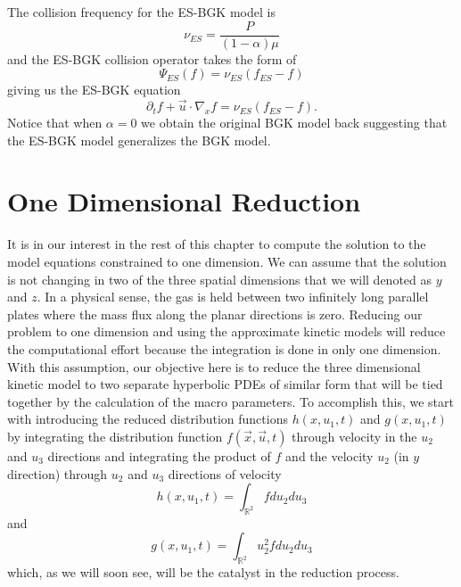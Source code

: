 The collision frequency for the ES-BGK model is
%
\begin{equation}
\nu_{ES} = \frac{P}{(1 - \alpha) \mu}
\end{equation}
%
and the ES-BGK collision operator takes the form of
%
\begin{equation}
\label{ESBGK}
\Psi_{ES}(f) = \nu_{ES} \left(f_{ES} - f \right)
\end{equation}
%
giving us the ES-BGK equation
%
\begin{equation}
\label{ESBGKeq}
\partial_t f + \vec{u} \cdot \nabla_x f = \nu_{ES} \left(f_{ES} - f \right).
\end{equation}
%
Notice that when $\alpha = 0$ we obtain the original BGK model back suggesting that the ES-BGK model generalizes the BGK model.
\section{One Dimensional Reduction}
It is in our interest in the rest of this chapter to compute the solution to the model equations constrained to one dimension. We can assume that the solution is not changing in two of the three spatial dimensions that we will denoted as $y$ and $z$. In a physical sense, the gas is held between two infinitely long parallel plates where the mass flux along the planar directions is zero. Reducing our problem to one dimension and using the approximate kinetic models will reduce the computational effort because the integration is done in only one dimension. With this assumption, our objective here is to reduce the three dimensional kinetic model to two separate hyperbolic PDEs of similar form that will be tied together by the calculation of the macro parameters. To accomplish this, we start with introducing the reduced distribution functions $h(x,u_1,t)$ and $g(x,u_1,t)$ by integrating the distribution function $f(\vec{x},\vec{u},t)$ through velocity in the $u_2$ and $u_3$ directions and integrating the product of $f$ and the velocity $u_2$ (in $y$ direction) through $u_2$ and $u_3$ directions of velocity
%
\begin{equation}
\label{f1}
h(x,u_1,t) = \int_{\mathbb{R}^2} f du_2 du_3
\end{equation}
%
and
%
\begin{equation}
\label{f2}
g(x,u_1,t) = \int_{\mathbb{R}^2} u_2^2 f du_2 du_3
\end{equation}
%
which, as we will soon see, will be the catalyst in the reduction process.
